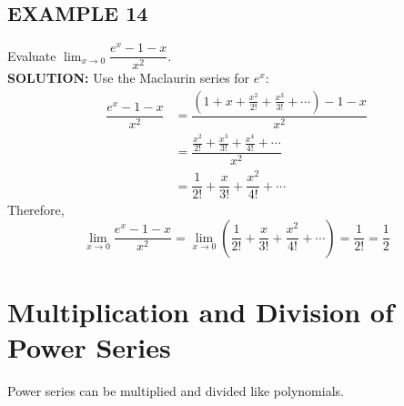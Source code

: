 \documentclass{article}
\theoremstyle{mystyle}
\begin{document}
\subsection*{EXAMPLE 14}
Evaluate \( \lim_{x\to 0} \dfrac{e^x - 1 - x}{x^2} \).\\
\textbf{SOLUTION:}
Use the Maclaurin series for \(e^x\):
\begin{align*}
 \dfrac{e^x - 1 - x}{x^2} &= \dfrac{(1 + x + \frac{x^2}{2!} + \frac{x^3}{3!} + \cdots) - 1 - x}{x^2} \\
 &= \dfrac{\frac{x^2}{2!} + \frac{x^3}{3!} + \frac{x^4}{4!} + \cdots}{x^2} \\
 &= \dfrac{1}{2!} + \dfrac{x}{3!} + \dfrac{x^2}{4!} + \cdots
\end{align*}
Therefore,
\[ \lim_{x\to 0} \dfrac{e^x - 1 - x}{x^2} = \lim_{x\to 0} \left( \dfrac{1}{2!} + \dfrac{x}{3!} + \dfrac{x^2}{4!} + \cdots \right) = \dfrac{1}{2!} = \dfrac{1}{2} \]

\section*{Multiplication and Division of Power Series}
Power series can be multiplied and divided like polynomials.
\end{document}

